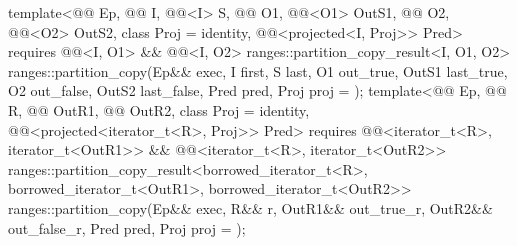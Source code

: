 \begin{itemdecl}
template<@@ Ep, @@ I, @@<I> S,
         @@ O1, @@<O1> OutS1,
         @@ O2, @@<O2> OutS2,
         class Proj = identity, @@<projected<I, Proj>> Pred>
  requires @@<I, O1> && @@<I, O2>
  ranges::partition_copy_result<I, O1, O2>
    ranges::partition_copy(Ep&& exec, I first, S last, O1 out_true, OutS1 last_true,
                           O2 out_false, OutS2 last_false, Pred pred, Proj proj = {});
template<@@ Ep, @@ R,
         @@ OutR1, @@ OutR2,
         class Proj = identity,
         @@<projected<iterator_t<R>, Proj>> Pred>
  requires @@<iterator_t<R>, iterator_t<OutR1>> &&
           @@<iterator_t<R>, iterator_t<OutR2>>
  ranges::partition_copy_result<borrowed_iterator_t<R>, borrowed_iterator_t<OutR1>,
                                borrowed_iterator_t<OutR2>>
    ranges::partition_copy(Ep&& exec, R&& r, OutR1&& out_true_r, OutR2&& out_false_r,
                           Pred pred, Proj proj = {});
\end{itemdecl}

